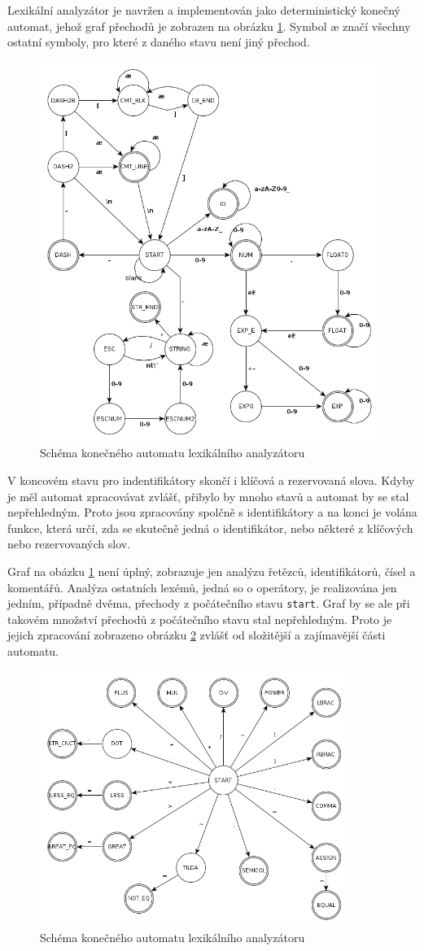 Lexikální analyzátor je navržen a implementován jako deterministický ko\-neč\-ný automat, jehož graf přechodů je zobrazen na obrázku \ref{lex.lex}. Symbol \ae{} značí všechny ostatní symboly, pro které z daného stavu není jiný přechod.

\begin{figure}
\centering
\includegraphics[width=11cm]{lexical.png}
\caption{Schéma konečného automatu lexikálního analyzátoru}
\label{lex.lex}
\end{figure}

V koncovém stavu pro indentifikátory skončí i klíčová a rezervovaná slova. Kdyby je měl automat zpracovávat zvlášť, přibylo by mnoho stavů a automat by se stal nepřehledným. Proto jsou zpracovány spolčně s identifikátory a na konci je volána funkce, která určí, zda se skutečně jedná o identifikátor, nebo některé z klíčových nebo rezervovaných slov.

Graf na obázku \ref{lex.lex} není úplný, zobrazuje jen analýzu řetězců, identifikátorů, čísel a komentářů. Analýza ostatních lexémů, jedná so o operátory, je realizována jen jedním, případně dvěma, přechody z počátečního stavu {\tt start}. Graf by se ale při takovém množství přechodů z počátečního stavu stal nepřehledným. Proto je jejich zpracování zobrazeno obrázku \ref{lex.ope} zvlášť od složitější a zajímavější části automatu.

\begin{figure}
\centering
\includegraphics[width=10cm]{operator.png}
\caption{Schéma konečného automatu lexikálního analyzátoru}
\label{lex.ope}
\end{figure}
